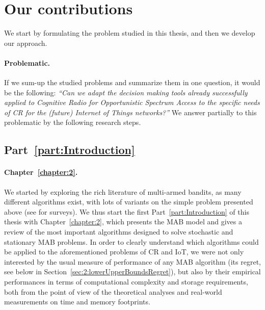 
\section{Our contributions}
\label{sec:1:contributions}

We start by formulating the problem studied in this thesis, and then we develop our approach.

\paragraph{Problematic.}
%
If we sum-up the studied problems and summarize them in one question, it would be the following:
\emph{``Can we adapt the decision making tools already successfully applied to Cognitive Radio for Opportunistic Spectrum Access to the specific needs of CR for the (future) Internet of Things networks?''}
%
We answer partially to this problematic by the following research steps.


\subsection{Part~\ref{part:Introduction}}

\paragraph{Chapter~\ref{chapter:2}.}
%
We started by exploring the rich literature of multi-armed bandits,
as many different algorithms exist, with lots of variants on the simple problem presented above (see \cite{LattimoreBanditAlgorithmsBook,Slivkins2019} for surveys).
We thus start the first Part~\ref{part:Introduction} of this thesis with Chapter~\ref{chapter:2}, which presents the MAB model and gives a review of the most important algorithms designed to solve stochastic and stationary MAB problems.
%
In order to clearly understand which algorithms could be applied to the aforementioned problems of CR and IoT,
we were not only interested by the usual measure of performance of any MAB algorithm (its regret, see below in Section~\ref{sec:2:lowerUpperBoundsRegret}),
but also by their empirical performances in terms of computational complexity and storage requirements, both from the point of view of the theoretical analyses and real-world measurements on time and memory footprints.


